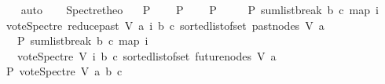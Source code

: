 \begin{isabellebody}
%
\isadelimproof
\ \ %
\endisadelimproof
%
\isatagproof
{}\isamarkupfalse%
\ auto%
\endisatagproof
{\isafoldproof}%
%
\isadelimproof
\isanewline
%
\endisadelimproof
\ \ \isanewline
\isanewline
{}\isamarkupfalse%
\ Spectre{\isacharunderscore}{\kern0pt}theo{\isacharcolon}{\kern0pt}\isanewline
\ \ \ {\isachardoublequoteopen}P\ {}{\isachardoublequoteclose}\isanewline
\ \ \ {\isachardoublequoteopen}P\ {}{\isachardoublequoteclose}\isanewline
\ \ \ {\isachardoublequoteopen}P\ {\isacharparenleft}{\kern0pt}{\isacharminus}{\kern0pt}{}{\isacharparenright}{\kern0pt}{\isachardoublequoteclose}\ \isanewline
\ \ \ {\isachardoublequoteopen}P\ {\isacharparenleft}{\kern0pt}sumlist{\isacharunderscore}{\kern0pt}break\ b\ c\ {\isacharparenleft}{\kern0pt}map\ {\isacharparenleft}{\kern0pt}{\isasymlambda}i{\isachardot}{\kern0pt}\isanewline
\ {\isacharparenleft}{\kern0pt}vote{\isacharunderscore}{\kern0pt}Spectre\ {\isacharparenleft}{\kern0pt}reduce{\isacharunderscore}{\kern0pt}past\ V\ a{\isacharparenright}{\kern0pt}\ i\ b\ c{\isacharparenright}{\kern0pt}{\isacharparenright}{\kern0pt}\ {\isacharparenleft}{\kern0pt}sorted{\isacharunderscore}{\kern0pt}list{\isacharunderscore}{\kern0pt}of{\isacharunderscore}{\kern0pt}set\ {\isacharparenleft}{\kern0pt}{\isacharparenleft}{\kern0pt}past{\isacharunderscore}{\kern0pt}nodes\ V\ a{\isacharparenright}{\kern0pt}{\isacharparenright}{\kern0pt}{\isacharparenright}{\kern0pt}{\isacharparenright}{\kern0pt}{\isacharparenright}{\kern0pt}{\isachardoublequoteclose}\isanewline
\ \ \ {\isachardoublequoteopen}P\ {\isacharparenleft}{\kern0pt}sumlist{\isacharunderscore}{\kern0pt}break\ b\ c\ {\isacharparenleft}{\kern0pt}map\ {\isacharparenleft}{\kern0pt}{\isasymlambda}i{\isachardot}{\kern0pt}\isanewline
\ \ \ {\isacharparenleft}{\kern0pt}vote{\isacharunderscore}{\kern0pt}Spectre\ V\ i\ b\ c{\isacharparenright}{\kern0pt}{\isacharparenright}{\kern0pt}\ {\isacharparenleft}{\kern0pt}sorted{\isacharunderscore}{\kern0pt}list{\isacharunderscore}{\kern0pt}of{\isacharunderscore}{\kern0pt}set\ {\isacharparenleft}{\kern0pt}future{\isacharunderscore}{\kern0pt}nodes\ V\ a{\isacharparenright}{\kern0pt}{\isacharparenright}{\kern0pt}{\isacharparenright}{\kern0pt}{\isacharparenright}{\kern0pt}{\isachardoublequoteclose}\isanewline
{}\ {\isachardoublequoteopen}P\ {\isacharparenleft}{\kern0pt}vote{\isacharunderscore}{\kern0pt}Spectre\ V\ a\ b\ c{\isacharparenright}{\kern0pt}{\isachardoublequoteclose}\isanewline
%

\end{isabellebody}
